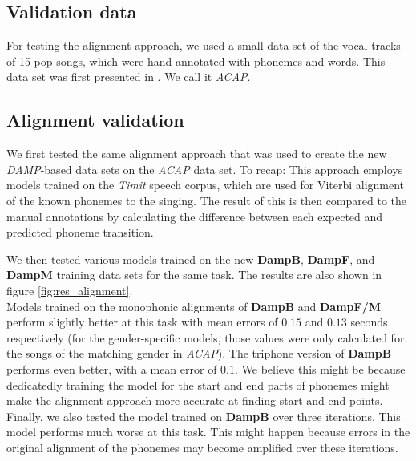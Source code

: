 \subsection{Validation data}\label{subsec:validation_data}
For testing the alignment approach, we used a small data set of the vocal tracks of 15 pop songs, which were hand-annotated with phonemes and words. This data set was first presented in \cite{jens}. We call it \textit{ACAP}.
\subsection{Alignment validation}
We first tested the same alignment approach that was used to create the new \textit{DAMP}-based data sets on the \textit{ACAP} data set. To recap: This approach employs models trained on the \textit{Timit} speech corpus, which are used for Viterbi alignment of the known phonemes to the singing. The result of this is then compared to the manual annotations by calculating the difference between each expected and predicted phoneme transition. 



We then tested various models trained on the new \textbf{DampB}, \textbf{DampF}, and \textbf{DampM} training data sets for the same task. The results are also shown in figure \ref{fig:res_alignment}.\\
Models trained on the monophonic alignments of \textbf{DampB} and \textbf{DampF/M} perform slightly better at this task with mean errors of $0.15$ and $0.13$ seconds respectively (for the gender-specific models, those values were only calculated for the songs of the matching gender in \textit{ACAP}). The triphone version of \textbf{DampB} performs even better, with a mean error of $0.1$. We believe this might be because dedicatedly training the model for the start and end parts of phonemes might make the alignment approach more accurate at finding start and end points.\\
Finally, we also tested the model trained on \textbf{DampB} over three iterations. This model performs much worse at this task. This might happen because errors in the original alignment of the phonemes may become amplified over these iterations.

